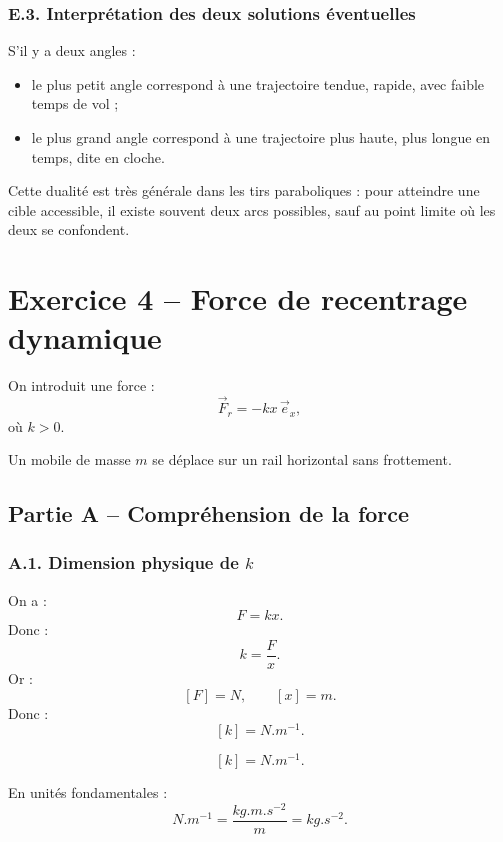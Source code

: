 \documentclass[11pt,a4paper]{article}
\begin{document}
\subsubsection*{E.3. Interprétation des deux solutions éventuelles}

S'il y a deux angles :
\begin{itemize}
  \item le plus petit angle correspond à une trajectoire tendue, rapide, avec faible temps de vol ;
  \item le plus grand angle correspond à une trajectoire plus haute, plus longue en temps, dite en cloche.
\end{itemize}

\begin{remarquebox}
Cette dualité est très générale dans les tirs paraboliques : pour atteindre une cible accessible,
il existe souvent deux arcs possibles, sauf au point limite où les deux se confondent.
\end{remarquebox}

\newpage
\section{Exercice 4 -- Force de recentrage dynamique}

On introduit une force :
\[
\vec F_r=-kx\,\vec e_x,
\]
où $k>0$.

Un mobile de masse $m$ se déplace sur un rail horizontal sans frottement.

\subsection{Partie A -- Compréhension de la force}

\subsubsection*{A.1. Dimension physique de $k$}

On a :
\[
F=kx.
\]
Donc :
\[
k=\frac{F}{x}.
\]
Or :
\[
[F]=\si{N},\qquad [x]=\si{m}.
\]
Donc :
\[
[k]=\si{N.m^{-1}}.
\]

\begin{resultatbox}
\[
\boxed{[k]=\si{N.m^{-1}}.}
\]
\end{resultatbox}

En unités fondamentales :
\[
\si{N.m^{-1}}=\frac{\si{kg.m.s^{-2}}}{\si{m}}
=\si{kg.s^{-2}}.
\]
\end{document}
